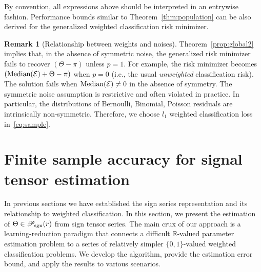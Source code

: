 \documentclass[twoside,11pt]{article}
\theoremstyle{definition}
\newtheorem{rmk}{Remark}
\def\sign{\textup{sgn}}
\def\caliP{\mathscr{P}_{\textup{sgn}}}
\begin{document}
By convention, all expressions above should be interpreted in an entrywise fashion. Performance bounds similar to Theorem~\ref{thm:population} can be also derived for the generalized weighted classification risk minimizer. 
\begin{rmk}[Relationship between weights and noises]
Theorem~\ref{prop:global2} implies that, in the absence of symmetric noise, the generalized risk minimizer fails to recover $(\Theta-\pi)$ unless $p = 1$. For example, the risk minimizer becomes $(\text{Median}(\mathcal{E})+\Theta-\pi)$ when $p=0$ (i.e., the usual \emph{unweighted} classification risk). The solution fails when $\text{Median}(\mathcal{E})\neq 0$ in the absence of symmetry. The symmetric noise assumption is restrictive and often violated in practice. In particular, the distributions of Bernoulli, Binomial, Poisson residuals are intrinsically non-symmetric. Therefore, we choose $l_1$ weighted classification loss in~\eqref{eq:sample}. 
\end{rmk}


\section{Finite sample accuracy for signal tensor estimation}\label{sec:estimation}

In previous sections we have established the sign series representation and its relationship to weighted classification. In this section, we present the estimation of $\Theta \in \caliP(r)$ from sign tensor series. The main crux of our approach is a learning-reduction paradigm that connects a difficult $\mathbb{R}$-valued parameter estimation problem to a series of relatively simpler $\{0,1\}$-valued weighted classification problems. We develop the algorithm, provide the estimation error bound, and apply the results to various scenarios.
\end{document}
